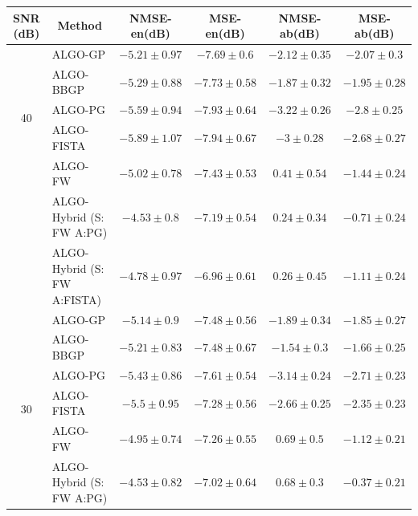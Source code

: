 \begin{table}[h]
\centering
\begin{adjustbox}{max width=\textwidth}
\begin{tabular}{|c|l|c|c|c|c|}
\hline
SNR (dB)            & \multicolumn{1}{c|}{Method}       & NMSE-en(dB)         & MSE-en(dB)          & NMSE-ab(dB)         & MSE-ab(dB)          \tabularnewline \hline
\multirow{5}{*}{40} & ALGO-GP                    & $-5.21    \pm 0.97$ & $-7.69    \pm 0.6$  & $-2.12    \pm 0.35$ & $-2.07    \pm 0.3$  \tabularnewline
                    & ALGO-BBGP                  & $-5.29    \pm 0.88$ & $-7.73    \pm 0.58$ & $-1.87    \pm 0.32$ & $-1.95    \pm 0.28$ \tabularnewline
                    & ALGO-PG                    & $-5.59    \pm 0.94$ & $-7.93    \pm 0.64$ & $-3.22    \pm 0.26$ & $-2.8     \pm 0.25$ \tabularnewline
                    & ALGO-FISTA                 & $-5.89    \pm 1.07$ & $-7.94    \pm 0.67$ & $-3       \pm 0.28$ & $-2.68    \pm 0.27$ \tabularnewline
                    & ALGO-FW                    & $-5.02    \pm 0.78$ & $-7.43    \pm 0.53$ & $0.41     \pm 0.54$ & $-1.44    \pm 0.24$ \tabularnewline
                    & ALGO-Hybrid (S: FW A:PG)   & $-4.53    \pm 0.8$  & $-7.19    \pm 0.54$ & $0.24     \pm 0.34$ & $-0.71    \pm 0.24$ \tabularnewline
                    & ALGO-Hybrid (S: FW A:FISTA)& $-4.78    \pm 0.97$ & $-6.96    \pm 0.61$ & $0.26     \pm 0.45$ & $-1.11    \pm 0.24$ \tabularnewline \hline
\multirow{7}{*}{30} & ALGO-GP                    & $-5.14    \pm 0.9$  & $-7.48    \pm 0.56$ & $-1.89    \pm 0.34$ & $-1.85    \pm 0.27$ \tabularnewline
                    & ALGO-BBGP                  & $-5.21    \pm 0.83$ & $-7.48    \pm 0.67$ & $-1.54    \pm 0.3$  & $-1.66    \pm 0.25$ \tabularnewline
                    & ALGO-PG                    & $-5.43    \pm 0.86$ & $-7.61    \pm 0.54$ & $-3.14    \pm 0.24$ & $-2.71    \pm 0.23$ \tabularnewline
                    & ALGO-FISTA                 & $-5.5     \pm 0.95$ & $-7.28    \pm 0.56$ & $-2.66    \pm 0.25$ & $-2.35    \pm 0.23$ \tabularnewline
                    & ALGO-FW                    & $-4.95    \pm 0.74$ & $-7.26    \pm 0.55$ & $0.69     \pm 0.5$  & $-1.12    \pm 0.21$ \tabularnewline
                    & ALGO-Hybrid (S: FW A:PG)   & $-4.53    \pm 0.82$ & $-7.02    \pm 0.64$ & $0.68     \pm 0.3$  & $-0.37    \pm 0.21$ \tabularnewline

\end{tabular}
\end{adjustbox}
\end{table}
